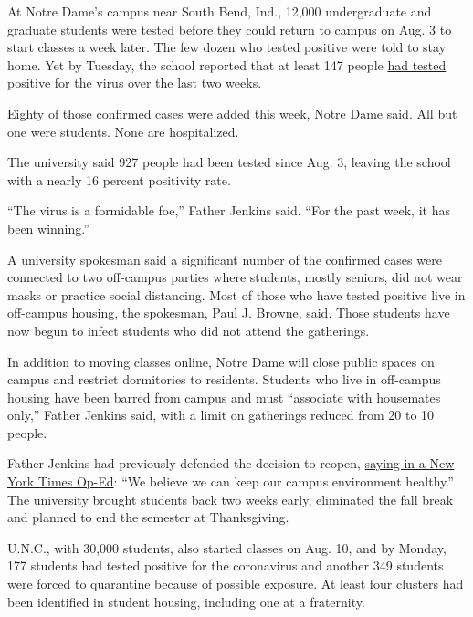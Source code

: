 At Notre Dame's campus near South Bend, Ind., 12,000 undergraduate and
graduate students were tested before they could return to campus on Aug.
3 to start classes a week later. The few dozen who tested positive were
told to stay home. Yet by Tuesday, the school reported that at least 147
people \href{https://here.nd.edu/our-approach/dashboard/}{had tested
positive} for the virus over the last two weeks.

Eighty of those confirmed cases were added this week, Notre Dame said.
All but one were students. None are hospitalized.

The university said 927 people had been tested since Aug. 3, leaving the
school with a nearly 16 percent positivity rate.

``The virus is a formidable foe,'' Father Jenkins said. ``For the past
week, it has been winning.''

A university spokesman said a significant number of the confirmed cases
were connected to two off-campus parties where students, mostly seniors,
did not wear masks or practice social distancing. Most of those who have
tested positive live in off-campus housing, the spokesman, Paul J.
Browne, said. Those students have now begun to infect students who did
not attend the gatherings.

In addition to moving classes online, Notre Dame will close public
spaces on campus and restrict dormitories to residents. Students who
live in off-campus housing have been barred from campus and must
``associate with housemates only,'' Father Jenkins said, with a limit on
gatherings reduced from 20 to 10 people.

Father Jenkins had previously defended the decision to reopen,
\href{https://www.nytimes3xbfgragh.onion/2020/05/26/opinion/notre-dame-university-coronavirus.html}{saying
in a New York Times Op-Ed}: ``We believe we can keep our campus
environment healthy.'' The university brought students back two weeks
early, eliminated the fall break and planned to end the semester at
Thanksgiving.

U.N.C., with 30,000 students, also started classes on Aug. 10, and by
Monday, 177 students had tested positive for the coronavirus and another
349 students were forced to quarantine because of possible exposure. At
least four clusters had been identified in student housing, including
one at a fraternity.

\href{https://www.nytimes3xbfgragh.onion/spotlight/schools-reopening?action=click\&pgtype=Article\&state=default\&region=MAIN_CONTENT_3\&context=storylines_keepup}{}

